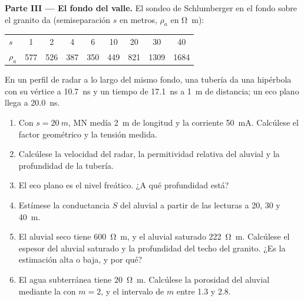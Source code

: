 \begin{problem}
\medskip\noindent\textbf{Parte III --- El fondo del valle.} El sondeo de Schlumberger
en el fondo sobre el granito da (semiseparación $s$ en
metros, $\rho_a$ en \unit{\ohm\metre}):
\begin{center}
\small
\begin{tabular}{lcccccccc}
\hline
$s$ & 1 & 2 & 4 & 6 & 10 & 20 & 30 & 40 \\
$\rho_a$ & 577 & 526 & 387 & 350 & 449 & 821 & 1309 & 1684 \\
\hline
\end{tabular}
\end{center}
En un perfil de radar a lo largo del mismo fondo, una tubería da una hipérbola con
su vértice a \qty{10.7}{ns} y un tiempo de \qty{17.1}{ns} a \qty{1}{m}
de distancia; un eco plano llega a \qty{20.0}{ns}.
\begin{enumerate}[resume]
\item Con $s = \qty{20}{m}$, MN medía \qty{2}{m} de longitud y la corriente
  \qty{50}{mA}. Calcúlese el factor geométrico y la tensión medida.
\item Calcúlese la velocidad del radar, la permitividad relativa del
  aluvial y la profundidad de la tubería.
\item El eco plano es el nivel freático. ¿A qué profundidad está?
\item Estímese la conductancia $S$ del aluvial a partir de las lecturas a
  20, 30 y \qty{40}{m}.
\item El aluvial seco tiene \qty{600}{\ohm\metre}, y el aluvial
  saturado \qty{222}{\ohm\metre}. Calcúlese el espesor del aluvial saturado
  y la profundidad del techo del granito. ¿Es la estimación alta
  o baja, y por qué?
\item El agua subterránea tiene \qty{20}{\ohm\metre}. Calcúlese la porosidad del
  aluvial mediante la  con $m = 2$, y el intervalo de $m$
  entre \num{1.3} y \num{2.8}.
\end{enumerate}


\end{problem}
